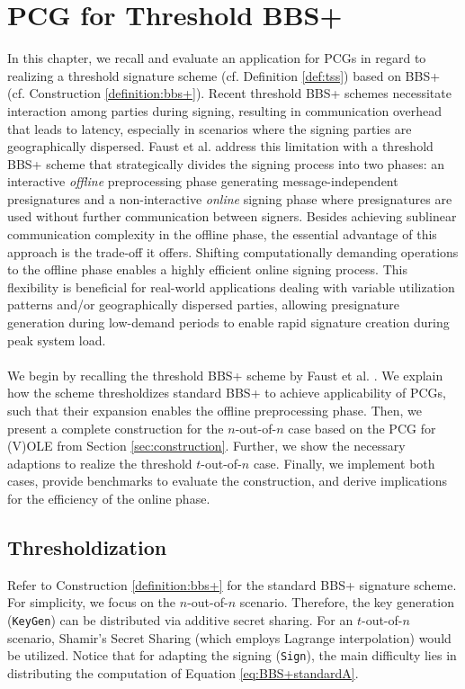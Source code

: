 \chapter{PCG for Threshold BBS+}
\label{chapter:PCGforBBSPlus}
In this chapter, we recall and evaluate an application for PCGs in regard to realizing a threshold signature scheme (cf. Definition \ref{def:tss}) based on BBS+ (cf. Construction \ref{definition:bbs+}). Recent threshold BBS+ schemes \cite{gennaro2019fully, doerner2023threshold} necessitate interaction among parties during signing, resulting in communication overhead that leads to latency, especially in scenarios where the signing parties are geographically dispersed. Faust et al. \cite{faust2023non} address this limitation with a threshold BBS+ scheme that strategically divides the signing process into two phases: an interactive \textit{offline} preprocessing phase generating message-independent presignatures and a non-interactive \textit{online} signing phase where presignatures are used without further communication between signers. Besides achieving sublinear communication complexity in the offline phase, the essential advantage of this approach is the trade-off it offers. Shifting computationally demanding operations to the offline phase enables a highly efficient online signing process. This flexibility is beneficial for real-world applications dealing with variable utilization patterns and/or geographically dispersed parties, allowing presignature generation during low-demand periods to enable rapid signature creation during peak system load. 
\\\\
We begin by recalling the threshold BBS+ scheme by Faust et al. \cite{faust2023non}. We explain how the scheme thresholdizes standard BBS+ to achieve applicability of PCGs, such that their expansion enables the offline preprocessing phase. Then, we present a complete construction for the $n$-out-of-$n$ case based on the PCG for (V)OLE from Section \ref{sec:construction}. Further, we show the necessary adaptions to realize the threshold $t$-out-of-$n$ case. Finally, we implement both cases, provide benchmarks to evaluate the construction, and derive implications for the efficiency of the online phase. 

\section{Thresholdization}
Refer to Construction \ref{definition:bbs+} for the standard BBS+ signature scheme. For simplicity, we focus on the $n$-out-of-$n$ scenario. Therefore, the key generation (\texttt{\textup{KeyGen}}) can be distributed via additive secret sharing. For an $t$-out-of-$n$ scenario, Shamir's Secret Sharing  \cite{shamir1979share} (which employs Lagrange interpolation) would be utilized. Notice that for adapting the signing (\texttt{\textup{Sign}}), the main difficulty lies in distributing the computation of Equation \ref{eq:BBS+standardA}.

